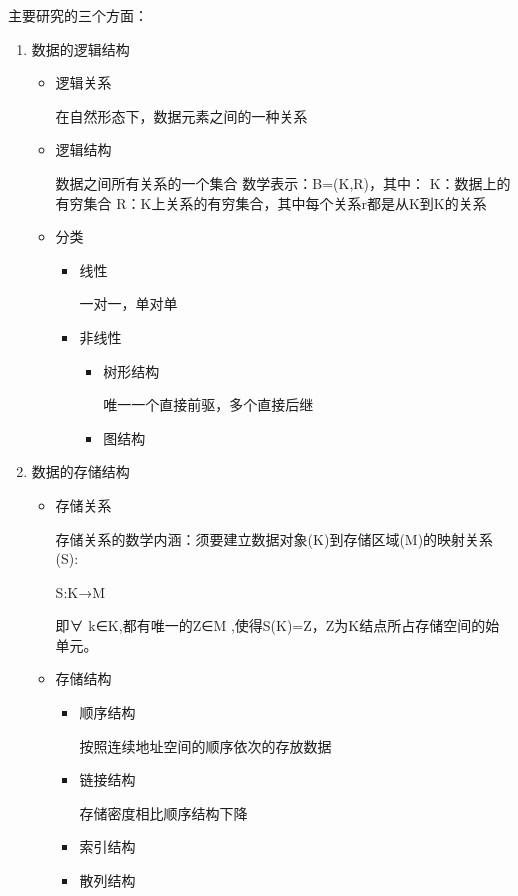 \documentclass[AutoFakeBold]{LZUThesis2007}
\begin{document}
	主要研究的三个方面：
\begin{enumerate}
	\item 数据的逻辑结构
		\begin{itemize}
		\item  逻辑关系
	
					在自然形态下，数据元素之间的一种关系
	
		\item  逻辑结构
	
					数据之间所有关系的一个集合
				数学表示：B=(K,R)，其中：
				K：数据上的有穷集合
				R：K上关系的有穷集合，其中每个关系r都是从K到K的关系
	
		\item  分类
	
			\begin{itemize}
				\item  线性
						
							一对一，单对单
		
				\item  非线性
				\begin{itemize}
					\item  树形结构
		
								唯一一个直接前驱，多个直接后继
		
					\item  图结构
				\end{itemize}
			\end{itemize}
		\end{itemize}

	\item 数据的存储结构
			\begin{itemize}
				\item  存储关系
	
							存储关系的数学内涵：须要建立数据对象(K)到存储区域(M)的映射关系(S):

							S:K→M

							即∀ k∈K,都有唯一的Z∈M ,使得S(K)=Z，Z为K结点所占存储空间的始单元。

	
				\item  存储结构
					\begin{itemize}
						\item  顺序结构
			
									按照连续地址空间的顺序依次的存放数据
			
						\item  链接结构

									存储密度相比顺序结构下降

						\item  索引结构
						\item  散列结构


\end{itemize}
\end{itemize}
\end{enumerate}
\end{document}
